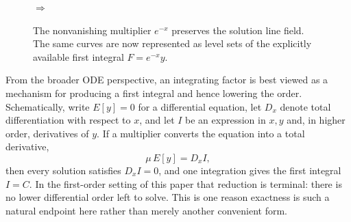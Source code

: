 \documentclass[11pt]{article}
\theoremstyle{definition}
\begin{document}
\begin{figure}[ht]
\centering
\begin{minipage}{0.45\textwidth}
\centering
{}
\end{minipage}
\hfill
{\Large\(\Longrightarrow\)}
\hfill
\begin{minipage}{0.45\textwidth}
\centering
{}
\end{minipage}
\caption{The nonvanishing multiplier \(e^{-x}\) preserves the solution line field. The same curves are now represented as level sets of the explicitly available first integral \(F=e^{-x}y\).}
\label{fig:foliation}
\end{figure}

From the broader ODE perspective, an integrating factor is best viewed as a mechanism for producing a first integral and hence lowering the order. Schematically, write \(E[y]=0\) for a differential equation, let \(D_x\) denote total differentiation with respect to \(x\), and let \(I\) be an expression in \(x,y\) and, in higher order, derivatives of \(y\). If a multiplier converts the equation into a total derivative,
\[
\mu\,E[y]=D_x I,
\]
then every solution satisfies \(D_xI=0\), and one integration gives the first integral \(I=C\). In the first-order setting of this paper that reduction is terminal: there is no lower differential order left to solve. This is one reason exactness is such a natural endpoint here rather than merely another convenient form.
\end{document}
